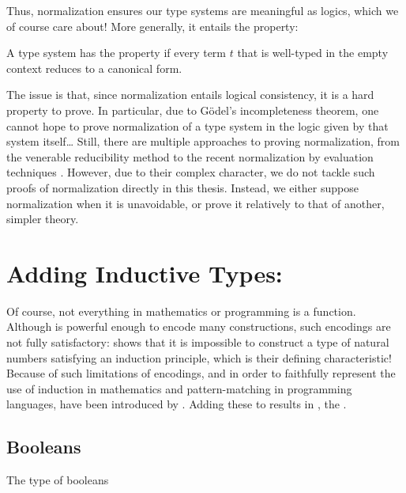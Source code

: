 Thus, normalization ensures our type systems are meaningful as logics,
which we of course care about! More generally, it entails the  property:

\begin{property}[Canonicity]
  \label{prop:canonicity}
  A type system has the  property
  if every term $t$ that is well-typed in the empty
  context reduces to a canonical form.
\end{property}

The issue is that, since normalization entails logical consistency, it is a hard
property to prove. In particular, due to Gödel’s incompleteness theorem, one cannot hope
to prove normalization of a type system in the logic given by that system itself…
Still, there are multiple approaches to proving normalization, from the venerable
reducibility method  to the recent normalization by evaluation 
techniques . However, due to their complex character, 
we do not tackle such proofs of normalization directly in this thesis. Instead, we
either suppose normalization when it is unavoidable,
or prove it relatively to that of another, simpler theory.

\section{Adding Inductive Types: }
\label{sec:tech-cic}

\AP Of course, not everything in mathematics or programming is a function.
Although  is powerful enough to encode many constructions,
such encodings are not fully satisfactory:  shows
that it is impossible to construct a type of natural numbers
satisfying an induction principle, which is their defining characteristic!
Because of such limitations of encodings, and in order to faithfully
represent the use of induction in mathematics and pattern-matching in programming languages,
 have been introduced by .
Adding these to  results in ,
the .

\subsection{Booleans}

\begin{marginfigure}
  \ContinuedFloat*
  \begin{mathpar}
    \label{rule:bool-type}
  \end{mathpar}
  \caption{The type of booleans}
  \label{fig:bool-type}
\end{marginfigure}

